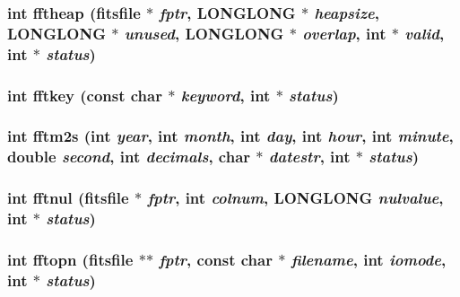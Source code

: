 \subsubsection{\setlength{\rightskip}{0pt plus 5cm}int fftheap (\bf{fitsfile} $\ast$ {\em fptr}, \bf{LONGLONG} $\ast$ {\em heapsize}, \bf{LONGLONG} $\ast$ {\em unused}, \bf{LONGLONG} $\ast$ {\em overlap}, int $\ast$ {\em valid}, int $\ast$ {\em status})}\label{fitsio_8h_d277821a2b2e94dcb7ae77c8a07ffc80}


\subsubsection{\setlength{\rightskip}{0pt plus 5cm}int fftkey (const char $\ast$ {\em keyword}, int $\ast$ {\em status})}\label{fitsio_8h_a66b87d10c8a5ab89b64dad26bfca0d6}


\subsubsection{\setlength{\rightskip}{0pt plus 5cm}int fftm2s (int {\em year}, int {\em month}, int {\em day}, int {\em hour}, int {\em minute}, double {\em second}, int {\em decimals}, char $\ast$ {\em datestr}, int $\ast$ {\em status})}\label{fitsio_8h_44819f15767833b9a8d664e0d07e5fea}


\subsubsection{\setlength{\rightskip}{0pt plus 5cm}int fftnul (\bf{fitsfile} $\ast$ {\em fptr}, int {\em colnum}, \bf{LONGLONG} {\em nulvalue}, int $\ast$ {\em status})}\label{fitsio_8h_813d7e81005862e106faec7f89bf7d6e}


\subsubsection{\setlength{\rightskip}{0pt plus 5cm}int fftopn (\bf{fitsfile} $\ast$$\ast$ {\em fptr}, const char $\ast$ {\em filename}, int {\em iomode}, int $\ast$ {\em status})}\label{fitsio_8h_043bb8b9d000367a0944ddb91a391176}


